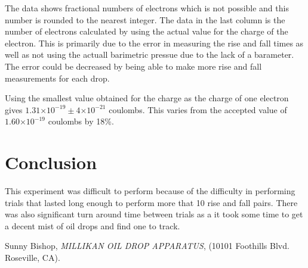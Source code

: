 \documentclass[twocolumn,secnumarabic,amssymb, nobibnotes, aps, pra]{revtex4}
\providecommand{\e}[1]{\ensuremath{\times 10^{#1}}}
\begin{document}
The data shows fractional numbers of electrons which is not possible and this number is rounded to the nearest integer.  The data in the last column is the number of electrons calculated by using the actual value for the charge of the electron.  This is primarily due to the error in measuring the rise and fall times as well as not using the actuall barimetric pressue due to the lack of a barameter.  The error could be decreased by being able to make more rise and fall measurements for each drop.  

Using the smallest value obtained for the charge as the charge of one electron gives $1.31\e{-19} \pm 4\e{-21}$ coulombs.  This varies from the accepted value of $1.60\e{-19}$ coulombs by 18\%.

\section{Conclusion}

This experiment was difficult to perform because of the difficulty in performing trials that lasted long enough to perform more that 10 rise and fall pairs.  There was also significant turn around time between trials as a it took some time to get a decent mist of oil drops and find one to track.  

\begin{thebibliography}{5}
 Sunny Bishop, \textit{MILLIKAN OIL DROP APPARATUS}, (10101 Foothills Blvd. Roseville, CA).
\end{thebibliography}
\end{document}
